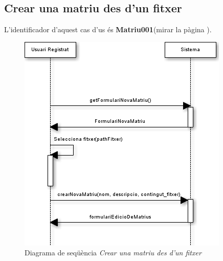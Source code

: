 \subsection*{Crear una matriu des d'un fitxer}
L'identificador d'aquest cas d'us \'{e}s \textbf{Matriu001}(mirar la p\`{a}gina \pageref{matriu001}).
\begin{figure}[H]
  \centering
  \includegraphics[scale=0.6]{img/specification/SequenceCreateMatrix.png}
  \caption{Diagrama de seqüència \textit{Crear una matriu des d'un fitxer}}
  \label{fig:sequencenewmatrixfromfile}
\end{figure}

